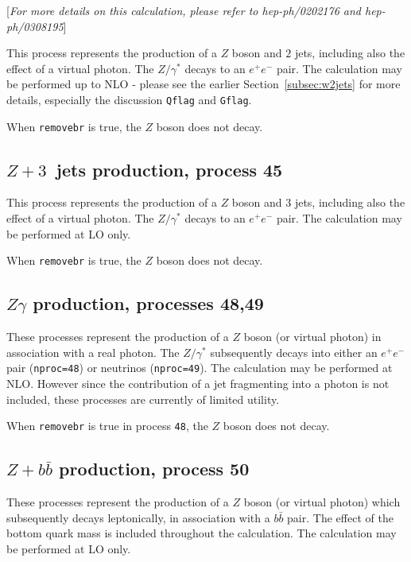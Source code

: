 \documentclass[12pt]{article}
\begin{document}
\begin{center}
[{\it For more details on this calculation, please refer to \break
 hep-ph/0202176 and hep-ph/0308195}]
\end{center}

This process represents the production of a $Z$ boson and $2$ jets,
including also the effect of a virtual photon. The $Z/\gamma^*$ decays
to an $e^+ e^-$ pair.  The calculation may be performed up to NLO -
please see the earlier Section~\ref{subsec:w2jets} for more details,
especially the discussion {\tt Qflag} and {\tt Gflag}.

When {\tt removebr} is true, the $Z$ boson does not decay.

\subsection{$Z+3$~jets production, process 45}
\label{subsec:z3jets}

This process represents the production of a $Z$ boson and $3$ jets,
including also the effect of a virtual photon. The $Z/\gamma^*$ decays
to an $e^+ e^-$ pair.  The calculation may be performed at LO only.

When {\tt removebr} is true, the $Z$ boson does not decay.

\subsection{$Z\gamma$ production, processes 48,49}
\label{subsec:zgamma}

These processes represent the production of a $Z$ boson (or virtual photon)
in association with a real photon. The $Z/\gamma^*$ subsequently decays into 
either an $e^+ e^-$ pair ({\tt nproc=48}) or neutrinos ({\tt nproc=49}).
The calculation may be performed at NLO. However since the contribution
of a jet fragmenting into a photon is not included, 
these processes are currently of limited utility.


When {\tt removebr} is true in process {\tt 48}, the $Z$ boson does not decay.

\subsection{$Z+b{\bar b}$ production, process 50}
\label{subsec:zbb}

These processes represent the production of a $Z$ boson (or virtual photon)
which subsequently decays leptonically, in association
with a $b{\bar b}$ pair. The effect of
the bottom quark mass is included throughout the calculation.  
The calculation may be performed at LO only.
\end{document}
